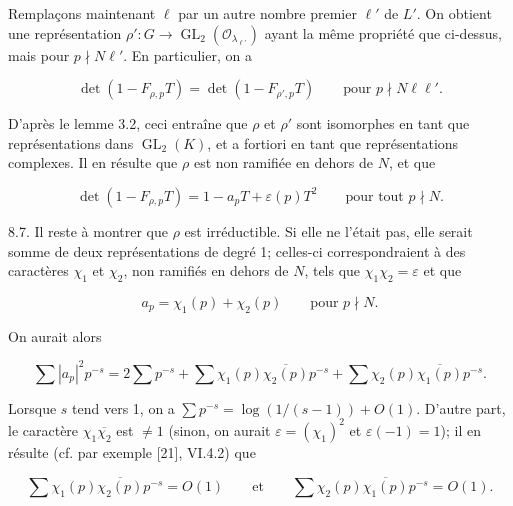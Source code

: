 \documentclass[10pt,oneside]{article}
\begin{document}
Remplaçons maintenant \(\ell\) par un autre nombre premier \(\ell'\) de \(L'\). On obtient une représentation \(\rho':G\longrightarrow\operatorname{GL}_2(\mathcal O_{\lambda_{\ell'}})\) ayant la même propriété que ci-dessus, mais pour \(p\nmid N\ell'\). En particulier, on a\par

\begin{equation*}
\det(1-F_{\rho,p}T)=\det(1-F_{\rho',p}T)
\qquad\text{pour }p\nmid N\ell\ell'.
\end{equation*}

D'après le lemme 3.2, ceci entraîne que \(\rho\) et \(\rho'\) sont isomorphes en tant que représentations dans \(\operatorname{GL}_2(K)\), et a fortiori en tant que représentations complexes. Il en résulte que \(\rho\) est non ramifiée en dehors de \(N\), et que\par

\begin{equation*}
\det(1-F_{\rho,p}T)=1-a_pT+\varepsilon(p)T^2
\qquad\text{pour tout }p\nmid N.
\end{equation*}

8.7. Il reste à montrer que \(\rho\) est irréductible. Si elle ne l'était pas, elle serait somme de deux représentations de degré 1; celles-ci correspondraient à des caractères \(\chi_1\) et \(\chi_2\), non ramifiés en dehors de \(N\), tels que \(\chi_1\chi_2=\varepsilon\) et que\par

\begin{equation*}
a_p=\chi_1(p)+\chi_2(p)
\qquad\text{pour }p\nmid N.
\end{equation*}

On aurait alors\par

\begin{equation*}
\sum|a_p|^2p^{-s}
=2\sum p^{-s}
+\sum\chi_1(p)\overline{\chi_2(p)}p^{-s}
+\sum\chi_2(p)\overline{\chi_1(p)}p^{-s}.
\end{equation*}

Lorsque \(s\) tend vers 1, on a \(\sum p^{-s}=\log(1/(s-1))+O(1)\). D'autre part, le caractère \(\chi_1\overline{\chi_2}\) est \(\ne1\) (sinon, on aurait \(\varepsilon=(\chi_1)^2\) et \(\varepsilon(-1)=1\)); il en résulte (cf. par exemple [21], VI.4.2) que\par

\begin{equation*}
\sum\chi_1(p)\overline{\chi_2(p)}p^{-s}=O(1)
\qquad\text{et}\qquad
\sum\chi_2(p)\overline{\chi_1(p)}p^{-s}=O(1).
\end{equation*}
\end{document}
